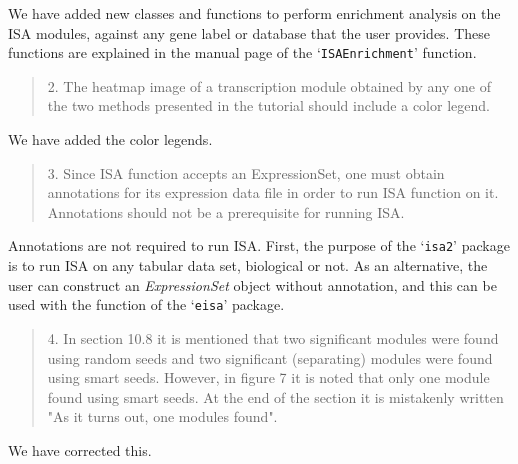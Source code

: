 \documentclass[a4paper]{article}
\newcommand{\Rpackage}[1]{`\texttt{#1}'}
\newcommand{\Rfunction}[1]{`\texttt{#1}'}
\newcommand{\Rclass}[1]{\textsl{#1}}
\begin{document}
We have added new classes and functions to perform enrichment analysis
on the ISA modules, against any gene label or database that the user
provides. These functions are explained in the manual page of the
\Rfunction{ISAEnrichment} function.

\begin{quote}
2.      The heatmap image of a transcription module obtained by any
one of the two methods presented in the tutorial should include a
color legend. 
\end{quote}

We have added the color legends.

\begin{quote}
3.      Since ISA function accepts an ExpressionSet, one must obtain
annotations for its expression data file in order to run ISA function
on it. Annotations should not be a prerequisite for running ISA. 
\end{quote}

Annotations are not required to run ISA. First, the purpose of the
\Rpackage{isa2} package is to run ISA on any tabular data set,
biological or not. As an alternative, the user can construct an
\Rclass{ExpressionSet} object without annotation, and this can be used
with the function of the \Rpackage{eisa} package.

\begin{quote}
4.      In section 10.8 it is mentioned that two significant modules
were found using random seeds and two significant (separating) modules
were found using smart seeds. However, in figure 7 it is noted that
only one module found using smart seeds. At the end of the section it
is mistakenly written "As it turns out, one modules found". 
\end{quote}

We have corrected this.



\end{document}
